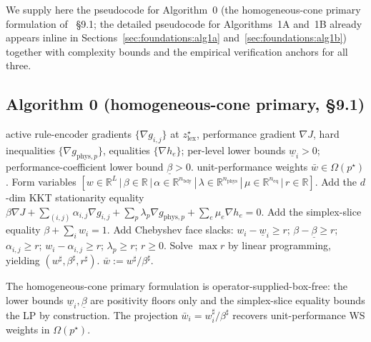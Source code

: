
We supply here the pseudocode for Algorithm~0 (the homogeneous-cone primary formulation of \cite{lcp2025}~\S9.1; the detailed pseudocode for Algorithms~1A and~1B already appears inline in Sections~\ref{sec:foundations:alg1a} and~\ref{sec:foundations:alg1b}) together with complexity bounds and the empirical verification anchors for all three.

\subsection*{Algorithm 0 (homogeneous-cone primary, \cite{lcp2025} \S9.1)}

\begin{algorithm}
\caption{\textsc{Alg.\ 0 --- homogeneous-cone primary}}
\label{alg:alg0}
\begin{algorithmic}[1]
\Require active rule-encoder gradients $\{\nabla g_{i,j}\}$ at $z_{\mathrm{lex}}^\star$, performance gradient $\nabla J$, hard inequalities $\{\nabla g_{\mathrm{phys},p}\}$, equalities $\{\nabla h_e\}$; per-level lower bounds $\underline w_i > 0$; performance-coefficient lower bound $\underline\beta > 0$.
\Ensure unit-performance weights $\bar w \in \Omega(p^\star)$.
\State Form variables $[w \in \mathbb R^L\,|\,\beta \in \mathbb R\,|\,\alpha \in \mathbb R^{n_{\mathrm{bdy}}}\,|\,\lambda \in \mathbb R^{n_{\mathrm{phys}}}\,|\,\mu \in \mathbb R^{n_{\mathrm{eq}}}\,|\,r \in \mathbb R]$.
\State Add the $d$-dim KKT stationarity equality $\beta \nabla J + \sum_{(i,j)} \alpha_{i,j} \nabla g_{i,j} + \sum_p \lambda_p \nabla g_{\mathrm{phys},p} + \sum_e \mu_e \nabla h_e = 0$.
\State Add the simplex-slice equality $\beta + \sum_i w_i = 1$.
\State Add Chebyshev face slacks: $w_i - \underline w_i \ge r$; $\beta - \underline\beta \ge r$; $\alpha_{i,j} \ge r$; $w_i - \alpha_{i,j} \ge r$; $\lambda_p \ge r$; $r \ge 0$.
\State Solve $\max r$ by linear programming, yielding $(w^\sharp, \beta^\sharp, r^\sharp)$.
\State \Return $\bar w := w^\sharp / \beta^\sharp$.
\end{algorithmic}
\end{algorithm}

The homogeneous-cone primary formulation is operator-supplied-box-free: the lower bounds $\underline w_i, \underline\beta$ are positivity floors only and the simplex-slice equality bounds the LP by construction. The projection $\bar w_i = w_i^\sharp / \beta^\sharp$ recovers unit-performance WS weights in $\Omega(p^\star)$.

